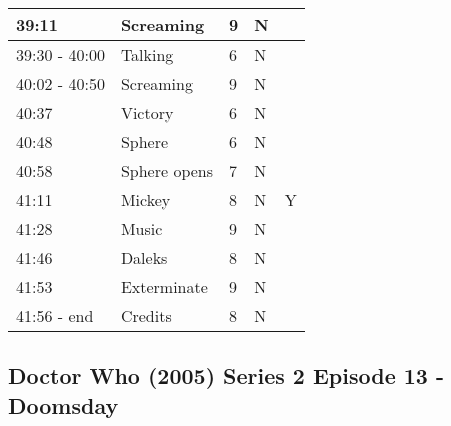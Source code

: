 \begin{longtable}{| p{70pt} | p{130pt} | p{45pt} | p{57pt} | p{60pt}|}
39:11           &           Screaming           &           9           &           N          &           \\\hline
39:30 - 40:00           &           Talking           &           6           &           N          &           \\\hline
40:02 - 40:50           &           Screaming           &           9           &           N          &           \\\hline
40:37           &           Victory           &           6           &           N          &           \\\hline
40:48           &           Sphere           &           6           &           N          &           \\\hline
40:58           &           Sphere opens           &           7           &           N          &           \\\hline
41:11           &           Mickey           &           8           &           N          & Y          \\\hline
41:28           &           Music           &           9           &           N          &           \\\hline
41:46           &           Daleks           &           8           &           N          &           \\\hline
41:53           &           Exterminate           &           9           &           N          &           \\\hline
41:56 - end           &           Credits           &           8           &           N          &           \\\hline
\end{longtable}

\newpage
\subsection{Doctor Who (2005) Series 2 Episode 13 -  Doomsday}
\label{sec:DrWhoEp13}


